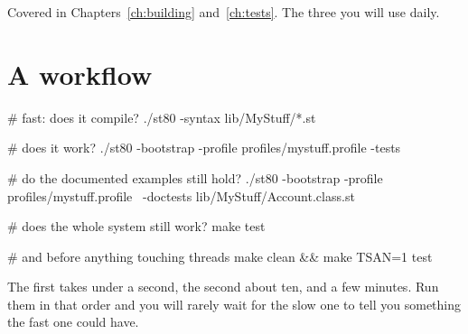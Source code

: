 Covered in Chapters~\ref{ch:building} and~\ref{ch:tests}. The three you will
use daily.

\section{A workflow}

\begin{sh}
# fast: does it compile?
./st80 -syntax lib/MyStuff/*.st

# does it work?
./st80 -bootstrap -profile profiles/mystuff.profile -tests

# do the documented examples still hold?
./st80 -bootstrap -profile profiles/mystuff.profile \
       -doctests lib/MyStuff/Account.class.st

# does the whole system still work?
make test

# and before anything touching threads
make clean && make TSAN=1 test
\end{sh}

The first takes under a second, the second about ten, and  a few
minutes. Run them in that order and you will rarely wait for the slow one to
tell you something the fast one could have.
